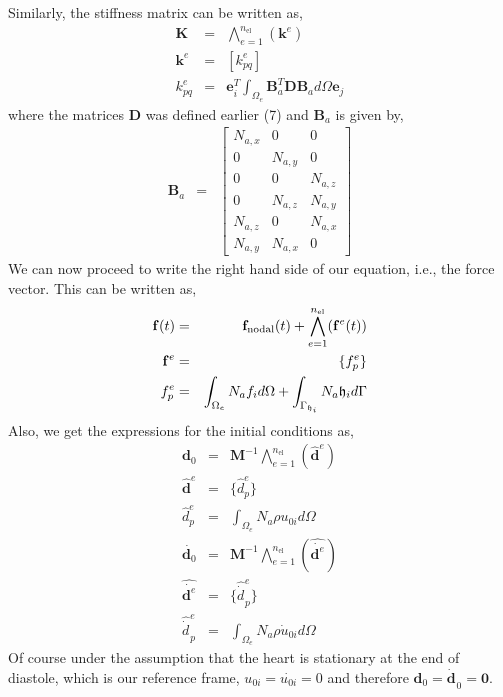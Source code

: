 \documentclass[10pt]{article}
\newcommand{\tmmathbf}[1]{\ensuremath{\boldsymbol{#1}}}
\newcommand{\tmop}[1]{\ensuremath{\operatorname{#1}}}
\begin{document}
Similarly, the stiffness matrix can be written as,
\begin{eqnarray}
  \tmmathbf{K} & = & \bigwedge_{e = 1}^{n_{\tmop{el}}} (\tmmathbf{k}^e )
  \nonumber\\
  \tmmathbf{k}^e & = & \left[ k_{p q}^e \right] \nonumber\\
  k_{p q}^e & = & \tmmathbf{e}_i^T \int_{\Omega_e} \tmmathbf{B}_a^T
  \tmmathbf{D} \tmmathbf{B}_a d \Omega \tmmathbf{e}_j 
\end{eqnarray}
where the matrices $\tmmathbf{D}$ was defined earlier (7) and $\tmmathbf{B}_a$
is given by,
\begin{eqnarray*}
  \tmmathbf{B}_a & = & \left[ \begin{array}{ccc}
    N_{a, x} & 0 & 0\\
    0 & N_{a, y} & 0\\
    0 & 0 & N_{a, z}\\
    0 & N_{a, z} & N_{a, y}\\
    N_{a, z} & 0 & N_{a, x}\\
    N_{a, y} & N_{a, x} & 0
  \end{array} \right]
\end{eqnarray*}
We can now proceed to write the right hand side of our equation, i.e., the
force vector. This can be written as,
\begin{eqnarray}
  \force( t ) & = & \force_{\tmop{nodal}} ( t ) +
  \bigwedge_{e = 1}^{n_{\tmop{el}}} (\force^e ( t ) ) \nonumber\\
  \force^e & = & \{ f_p^e \} \nonumber\\
  f_p^e & = & \int_{\Omega_e} N_a f_i d \Omega +
  \int_{\Gamma_{\mathfrak{h}_i}} N_a \mathfrak{h}_i d \Gamma 
\end{eqnarray}
Also, we get the expressions for the initial conditions as,
\begin{eqnarray*}
  \tmmathbf{d}_0 & = & \tmmathbf{M}^{- 1} \bigwedge_{e =
  1}^{n_{\tmop{el}}} ( \hat{\tmmathbf{d}}^e )\\
  \hat{\tmmathbf{d}}^e & = & \{ \hat{d}_p^e \}\\
  \hat{d}_p^e & = & \int_{\Omega_e} N_a \rho u_{0 i} d \Omega\\
  \dot{\tmmathbf{d}_0} & = & \tmmathbf{M}^{- 1} \bigwedge_{e =
  1}^{n_{\tmop{el}}} ( \widehat{\dot{\tmmathbf{d}^e}}^{} )\\
  \widehat{\dot{\tmmathbf{d}^e}} & = & \{ \widehat{\dot{d_{}^{}}} _p^e \}\\
  \widehat{\dot{d_{}^{}}} _p^e & = & \int_{\Omega_e} N_a \rho \dot{u}_{0 i} d
  \Omega
\end{eqnarray*}
Of course under the assumption that the heart is stationary at the end of
diastole, which is our reference frame, $u_{0 i} = \dot{u_{0 i}} = 0$ and
therefore $\tmmathbf{d}_0 = \dot{\tmmathbf{d}_{}}_0 =\tmmathbf{0}$.
\end{document}
